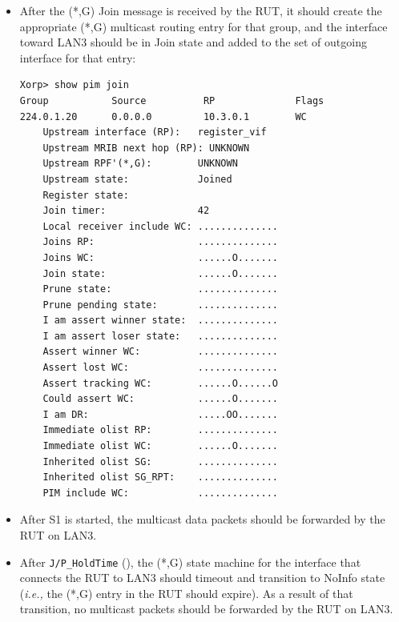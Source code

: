 \documentclass[11pt]{report}
\newcommand{\ie}{\emph{i.e.,}\xspace}
\begin{document}
\begin{itemize}

  \item After the (*,G) Join message is received by the RUT, it
  should create the appropriate (*,G) multicast routing entry for
  that group, and the interface toward LAN3 should be in Join state and
  added to the set of outgoing interface for that entry:

\begin{verbatim}
Xorp> show pim join 
Group           Source          RP              Flags
224.0.1.20      0.0.0.0         10.3.0.1        WC   
    Upstream interface (RP):   register_vif
    Upstream MRIB next hop (RP): UNKNOWN
    Upstream RPF'(*,G):        UNKNOWN
    Upstream state:            Joined 
    Register state:            
    Join timer:                42
    Local receiver include WC: ..............
    Joins RP:                  ..............
    Joins WC:                  ......O.......
    Join state:                ......O.......
    Prune state:               ..............
    Prune pending state:       ..............
    I am assert winner state:  ..............
    I am assert loser state:   ..............
    Assert winner WC:          ..............
    Assert lost WC:            ..............
    Assert tracking WC:        ......O......O
    Could assert WC:           ......O.......
    I am DR:                   .....OO.......
    Immediate olist RP:        ..............
    Immediate olist WC:        ......O.......
    Inherited olist SG:        ..............
    Inherited olist SG_RPT:    ..............
    PIM include WC:            ..............
\end{verbatim}

  \item After S1 is started, the multicast data packets should be
  forwarded by the RUT on LAN3.

  \item After \verb=J/P_HoldTime= ({\PimsmJPHoldTime}),
  the (*,G) state machine for the interface that connects the RUT to
  LAN3 should timeout and transition to NoInfo state
  (\ie the (*,G) entry in the RUT should expire).
  As a result of that transition, no multicast packets should be
  forwarded by the RUT on LAN3.

\end{itemize}

\end{document}
